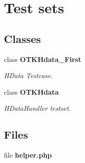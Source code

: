 \section{Test sets}
\label{group__OTK__TESTSETS}
\subsection*{Classes}
\begin{DoxyCompactItemize}
\item 
class {\bf OTKHdata\_\-First}
\begin{DoxyCompactList}\small\item\em HData Testcase. \end{DoxyCompactList}\item 
class {\bf OTKHdata}
\begin{DoxyCompactList}\small\item\em HDataHandler testset. \end{DoxyCompactList}\end{DoxyCompactItemize}
\subsection*{Files}
\begin{DoxyCompactItemize}
\item 
file {\bf helper.php}
\end{DoxyCompactItemize}
